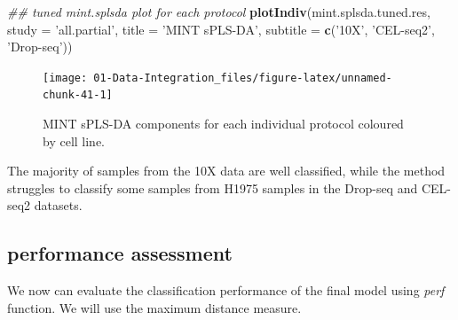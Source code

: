 \documentclass[]{book}
\newenvironment{Shaded}{\begin{snugshade}}{\end{snugshade}}
\newcommand{\CommentTok}[1]{\textcolor[rgb]{0.56,0.35,0.01}{\textit{#1}}}
\newcommand{\DataTypeTok}[1]{\textcolor[rgb]{0.13,0.29,0.53}{#1}}
\newcommand{\DecValTok}[1]{\textcolor[rgb]{0.00,0.00,0.81}{#1}}
\newcommand{\KeywordTok}[1]{\textcolor[rgb]{0.13,0.29,0.53}{\textbf{#1}}}
\newcommand{\NormalTok}[1]{#1}
\newcommand{\OperatorTok}[1]{\textcolor[rgb]{0.81,0.36,0.00}{\textbf{#1}}}
\newcommand{\StringTok}[1]{\textcolor[rgb]{0.31,0.60,0.02}{#1}}
\theoremstyle{definition}
\theoremstyle{definition}
\theoremstyle{definition}
\theoremstyle{remark}
\begin{document}
\begin{Shaded}
\begin{Highlighting}[]
\CommentTok{## tuned mint.splsda plot for each protocol}
\KeywordTok{plotIndiv}\NormalTok{(mint.splsda.tuned.res, }\DataTypeTok{study =} \StringTok{'all.partial'}\NormalTok{,  }\DataTypeTok{title =} \StringTok{'MINT sPLS-DA'}\NormalTok{, }
          \DataTypeTok{subtitle =} \KeywordTok{c}\NormalTok{(}\StringTok{'10X'}\NormalTok{, }\StringTok{'CEL-seq2'}\NormalTok{, }\StringTok{'Drop-seq'}\NormalTok{))}
\end{Highlighting}
\end{Shaded}

\begin{figure}[ht]

{\centering \texttt{[image: 01-Data-Integration\_files/figure-latex/unnamed-chunk-41-1]} 

}

\caption{MINT sPLS-DA components for each individual protocol coloured by cell line.}\label{fig:unnamed-chunk-41}
\end{figure}

The majority of samples from the 10X data are well classified, while the
method struggles to classify some samples from H1975 samples in the
Drop-seq and CEL-seq2 datasets.

\hypertarget{performance-assessment}{%
\subsection{performance assessment}\label{performance-assessment}}

We now can evaluate the classification performance of the final model
using \emph{perf} function. We will use the maximum distance measure.

\begin{Shaded}
\end{Shaded}
\end{document}
